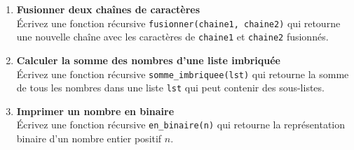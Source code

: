 \begin{enumerate}
    \item \textbf{Fusionner deux chaînes de caractères} \\
    Écrivez une fonction récursive \texttt{fusionner(chaine1, chaine2)} qui retourne une nouvelle chaîne avec les caractères de \texttt{chaine1} et \texttt{chaine2} fusionnés.

    \item \textbf{Calculer la somme des nombres d'une liste imbriquée} \\
    Écrivez une fonction récursive \texttt{somme\_imbriquee(lst)} qui retourne la somme de tous les nombres dans une liste \texttt{lst} qui peut contenir des sous-listes.

    \item \textbf{Imprimer un nombre en binaire} \\
    Écrivez une fonction récursive \texttt{en\_binaire(n)} qui retourne la représentation binaire d'un nombre entier positif $n$.
    
\end{enumerate}

